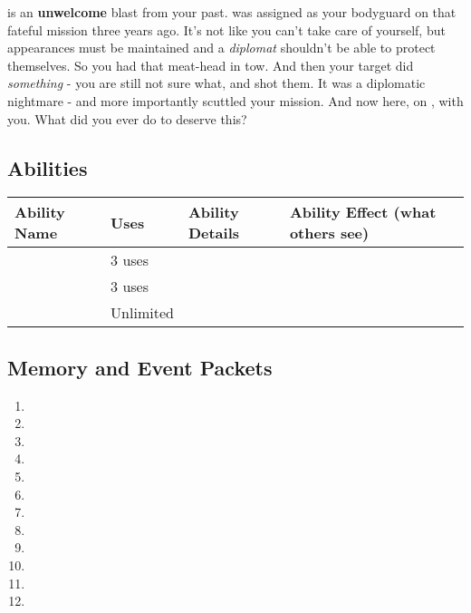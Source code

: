 \documentclass[char]{TMFHope}
\begin{document}
\cWeap{} is an {\bf unwelcome} blast from your past. \cWeap{} was assigned as your bodyguard on that fateful mission three years ago. It's not like you can't take care of yourself, but appearances must be maintained and a \emph{diplomat} shouldn't be able to protect themselves. So you had that meat-head in tow. And then your target did \emph{something} - you are still not sure what, and \cWeap{} shot them. It was a diplomatic nightmare - and more importantly scuttled your mission. And now \cWeap{\they} \cWeap{\are} here, on \pNew{}, with you. What did you ever do to deserve this?

\subsection*{Abilities}
\begin{tabular}{|p{3cm}|p{1.5cm}|p{7cm}|p{4.5cm}|} 
 \hline
 \textbf{Ability Name} & \textbf{Uses} & \textbf{Ability Details} & \textbf{Ability Effect (what others see)} \\ 
\hline 
 \aNegotiation{\MYname} & 3 uses & \aNegotiation{\MYtext} & \aNegotiation{\MYeffect} \\ 
\hline
 \aFirstAid{\MYname} & 3 uses & \aFirstAid{\MYtext} & \aFirstAid{\MYeffect}\\ 
 \hline
	\aPractice{\MYname} & Unlimited & \aPractice{\MYtext} & \aPractice{\MYeffect} \\ 
\hline
\end{tabular}

\subsection*{Memory and Event Packets}
\begin{enumerate}
	\item \mPractice{\MYname}
	\item \mDAlpha{\MYname}
	\item \mDiplomatOne{\MYname}
	\item \mDiplomatTwo{\MYname}
	\item \mDiplomatThree{\MYname}
	\item \mBroom{\MYname}
	\item \mLab{\MYname}
	\item \mPatient{\MYname}
	\item \mKitchen{\MYname}
	\item \mWeight{\MYname}
	\item \mTheater{\MYname}
	\item \mCrates{\MYname}
\end{enumerate}
\end{document}
